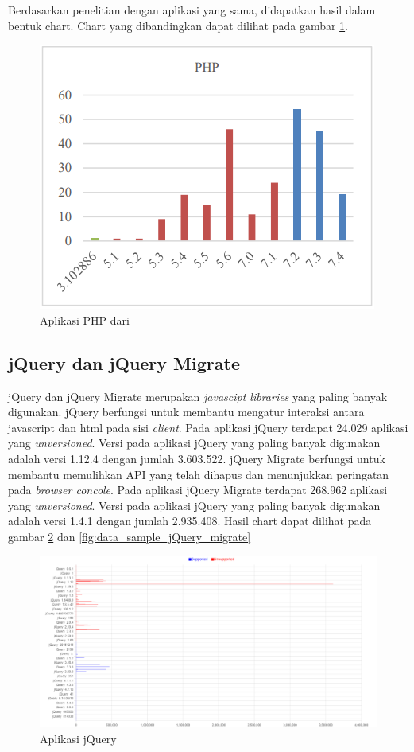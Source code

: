 Berdasarkan penelitian dengan aplikasi yang sama, didapatkan hasil dalam bentuk chart. Chart yang dibandingkan dapat dilihat pada gambar \ref{fig:data_sample_php_p}.

\begin{figure}[H]
	\centering  
	\includegraphics[scale=0.7]{Gambar/chart_pascal_php.PNG}  
	\caption{Aplikasi PHP dari \cite{pascal}} 
	\label{fig:data_sample_php_p} 
\end{figure}

\subsection{jQuery dan jQuery Migrate}
jQuery dan jQuery Migrate merupakan \textit{javascipt libraries} yang paling banyak digunakan. jQuery berfungsi untuk membantu mengatur interaksi antara javascript dan html pada sisi \textit{client}. Pada aplikasi jQuery terdapat 24.029 aplikasi yang \textit{unversioned}. Versi pada aplikasi jQuery yang paling banyak digunakan adalah versi 1.12.4 dengan jumlah 3.603.522. jQuery Migrate berfungsi untuk membantu memulihkan API yang telah dihapus dan menunjukkan peringatan pada \textit{browser concole}. Pada aplikasi jQuery Migrate terdapat 268.962 aplikasi yang \textit{unversioned}. Versi pada aplikasi jQuery yang paling banyak digunakan adalah versi 1.4.1 dengan jumlah 2.935.408. Hasil chart dapat dilihat pada gambar \ref{fig:data_sample_jQuery} dan  \ref{fig:data_sample_jQuery_migrate}
\begin{figure}[H]
	\centering  
	\includegraphics[scale=0.5]{Gambar/hasil_chart_jQuery.png}  
	\caption{Aplikasi jQuery} 
	\label{fig:data_sample_jQuery} 
\end{figure}

